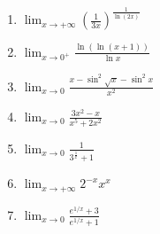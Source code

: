 \documentclass[11pt,a4paper]{article}
\begin{document}
\begin{enumerate}
\item $\displaystyle \lim_{x \to +\infty} \left(\frac{1}{3x}\right)^{\frac{1}{\ln(2x)}}$
\item $\displaystyle \lim_{x \to 0^{+}} \frac{\ln(\ln(x + 1))}{\ln x}$
\item $\displaystyle \lim_{x \to 0} \frac{x - \sin^{2}\sqrt{x} - \sin^{2} x}{x^{2}}$
\item $\displaystyle \lim_{x \to 0} \frac{3x^{2} - x}{x^{5} + 2x^{2}}$
\item $\displaystyle \lim_{x \to 0} \frac{1}{3^{\frac{1}{x}} + 1}$
\item $\displaystyle \lim_{x \to +\infty} 2^{-x}x^{x}$
\item $\displaystyle \lim_{x \to 0} \frac{e^{1/x} + 3}{e^{1/x} + 1}$
\end{enumerate}
\end{document}
